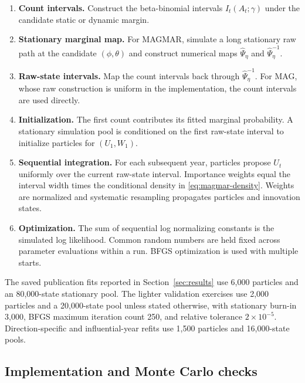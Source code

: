 \documentclass[11pt]{article}
\theoremstyle{definition}
\begin{document}
\begin{enumerate}[leftmargin=2.2em]
\item \textbf{Count intervals.} Construct the beta-binomial intervals
$I_t(A_t;\gamma)$ under the candidate static or dynamic margin.
\item \textbf{Stationary marginal map.} For MAGMAR, simulate a long stationary raw
path at the candidate $(\phi,\theta)$ and construct numerical maps
$\widehat\Psi_\eta$ and $\widehat\Psi_\eta^{-1}$.
\item \textbf{Raw-state intervals.} Map the count intervals back through
$\widehat\Psi_\eta^{-1}$. For MAG, whose raw construction is uniform in the
implementation, the count intervals are used directly.
\item \textbf{Initialization.} The first count contributes its fitted marginal
probability. A stationary simulation pool is conditioned on the first raw-state
interval to initialize particles for $(U_1,W_1)$.
\item \textbf{Sequential integration.} For each subsequent year, particles propose
$U_t$ uniformly over the current raw-state interval. Importance weights equal the
interval width times the conditional density in \eqref{eq:magmar-density}. Weights
are normalized and systematic resampling propagates particles and innovation states.
\item \textbf{Optimization.} The sum of sequential log normalizing constants is the
simulated log likelihood. Common random numbers are held fixed across parameter
evaluations within a run. BFGS optimization is used with multiple starts.
\end{enumerate}

The saved publication fits reported in Section~\ref{sec:results} use 6,000 particles
and an 80,000-state stationary pool. The lighter validation exercises use 2,000
particles and a 20,000-state pool unless stated otherwise, with stationary burn-in
3,000, BFGS maximum iteration count 250, and relative tolerance $2\times10^{-5}$.
Direction-specific and influential-year refits use 1,500 particles and 16,000-state
pools.


\subsection{Implementation and Monte Carlo checks}
\end{document}
